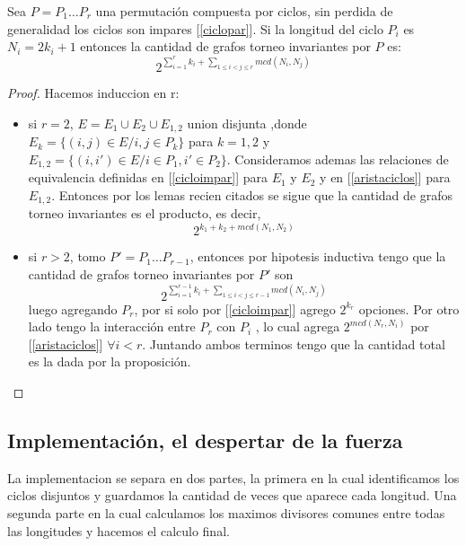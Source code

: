 	\begin{prop}
	Sea $P=P_1\dots P_r$ una permutaci\'on compuesta por ciclos,
sin perdida de generalidad los ciclos son impares [\ref{ciclopar}]. Si
la longitud del ciclo $P_i$ es $N_i=2k_i+1$ entonces la cantidad de 
grafos torneo invariantes por $P$ es:
	\begin{equation}
		2^{\sum_{i=1}^{r}k_i + \sum_{1\leq i<j\leq r}^{}mcd(N_i,N_j)}
	\end{equation}
	\end{prop}
	\begin{proof}
		Hacemos induccion en r:
		\begin{itemize}
			\item si $r=2$, $E=E_1\cup E_2\cup E_{1,2}$ union disjunta ,donde 
$E_k=\{(i,j)\in E/ i,j \in P_k \}$ para $k=1,2$ y 
$E_{1,2} =\{(i,i')\in E / i\in P_1 , i'\in P_2 \}$. Consideramos 
ademas las relaciones de equivalencia definidas en [\ref{cicloimpar}] para 
$E_1$ y $E_2$ y en [\ref{aristaciclos}] para $E_{1,2}$. Entonces por los
lemas recien citados se sigue que la cantidad de grafos torneo invariantes
es el producto, es decir,
				\begin{equation}
					2^{k_1+k_2+mcd(N_1,N_2)}
				\end{equation}  
			
			\item si $r>2$, tomo $P'=P_1\dots P_{r-1}$, entonces por hipotesis
inductiva tengo que la cantidad de grafos torneo invariantes por $P'$ son
				\begin{equation}
					2^{\sum_{i=1}^{r-1}k_i + \sum_{1\leq i<j\leq r-1}^{}mcd(N_i,N_j)}
				\end{equation}
luego agregando $P_r$, por si solo por [\ref{cicloimpar}] agrego $2^{k_r}$ 
opciones. Por otro lado tengo la interacci\'on entre $P_r$ con $P_i$ ,
lo cual agrega $2^{mcd(N_r,N_i)}$ por [\ref{aristaciclos}] $\forall i<r$.
Juntando ambos terminos tengo que la cantidad total es la dada por la proposici\'on.
		\end{itemize}
	\end{proof}
\subsection{Implementaci\'on, el despertar de la fuerza}
	La implementacion se separa en dos partes, la primera en la cual
identificamos los ciclos disjuntos y guardamos la cantidad de veces que
aparece cada longitud. Una segunda parte en la cual calculamos los
maximos divisores comunes entre todas las longitudes y hacemos el
calculo final.
	
